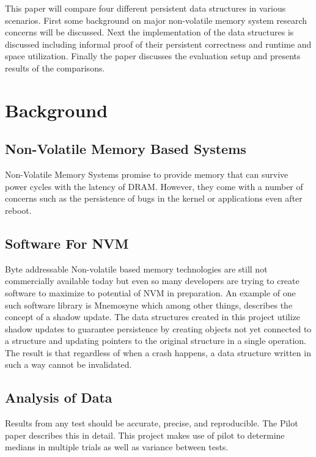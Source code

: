 \documentclass[twocolumn]{article}
\begin{document}
This paper will compare four different persistent data structures in various
scenarios. First some background on major non-volatile memory system research
concerns will be discussed. Next the implementation of the data structures is
discussed including informal proof of their persistent correctness and runtime
and space utilization. Finally the paper discusses the evaluation setup and
presents results of the comparisons.

\section{Background}

\subsection{Non-Volatile Memory Based Systems}

Non-Volatile Memory Systems promise to provide memory that can survive power
cycles with the latency of DRAM\cite{burr:ibmjrd08}. However, they come with a
number of concerns such as the persistence of bugs in the kernel or applications
even after reboot.

\subsection{Software For NVM}

Byte addressable Non-volatile based memory technologies are still not
commercially available today but even so many developers are trying to create
software to maximize to potential of NVM in preparation. An example of one such
software library is Mnemosyne\cite{volos:asplos11} which among other things,
describes the concept of a shadow update. The data structures created in this
project utilize shadow updates to guarantee persistence by creating objects not
yet connected to a structure and updating pointers to the original structure in
a single operation. The result is that regardless of when a crash happens, a
data structure written in such a way cannot be invalidated.

\subsection{Analysis of Data}

Results from any test should be accurate, precise, and reproducible. The Pilot
paper\cite{li:pilot} describes this in detail. This project makes use of pilot
to determine medians in multiple trials as well as variance between tests.
\end{document}
